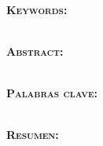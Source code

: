 % 
% 
% 

\newpage
\thispagestyle{empty}

\clearpage
\cleardoublepage
{}

\pagestyle{plain}



{}

{\noindent \large \textbf{\thesisTitle}}\\

{\noindent \textbf{\textsc{Keywords:}}}

{\noindent \thesisKeywords}\\

{\noindent \textbf{\textsc{Abstract:}}}

\noindent \lipsum[4-7]




\newpage
\thispagestyle{empty}

\clearpage
\cleardoublepage
{}

\pagestyle{plain}

{\noindent \large \textbf{\thesisTitle}}\\

{\noindent \textbf{\textsc{Palabras clave:}}}

{\noindent \thesisKeywords}\\


{\noindent \textbf{\textsc{Resumen:}}}

\noindent \lipsum[8-11]

